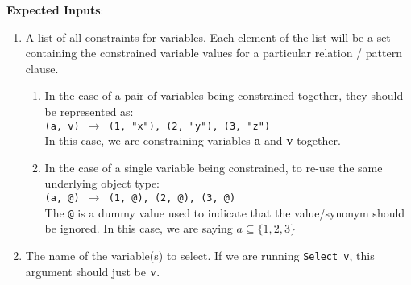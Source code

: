 \documentclass{article}
\begin{document}
\textbf{Expected Inputs}: 
\begin{enumerate}
    \item A list of all constraints for variables. Each element of the list will be a set containing the constrained variable values for a particular relation / pattern clause.
    \begin{enumerate}
        \item In the case of a pair of variables being constrained together, they should be represented as: \\ \texttt{(a, v) $\rightarrow$ {(1, "x"), (2, "y"), (3, "z")}} \\
        In this case, we are constraining variables \textbf{a} and \textbf{v} together. 
        \item In the case of a single variable being constrained, to re-use the same underlying object type: \\ \texttt{(a, @) $\rightarrow$ {(1, @), (2, @), (3, @)}} \\ The \texttt{@} is a dummy value used to indicate that the value/synonym should be ignored. In this case, we are saying $a \subseteq \{1, 2, 3\}$ 
    \end{enumerate}
    \item The name of the variable(s) to select. If we are running \texttt{Select v}, this argument should just be \textbf{v}.
\end{enumerate}
\end{document}
